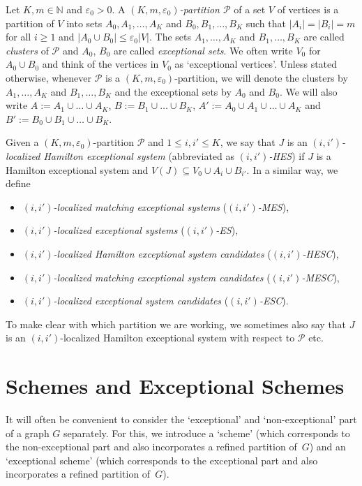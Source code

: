\documentclass{memo-l}
\def\cP{\mathcal{P}}
\def\eps{\varepsilon}
\def\epszero{\eps_0}
\numberwithin{section}{chapter}
\numberwithin{equation}{section}
\numberwithin{firstthm}{section}
\numberwithin{figure}{section}
\begin{document}
Let $K,m\in\mathbb{N}$ and $\eps_0>0$.
A \emph{$(K,m,\eps_0)$-partition $\mathcal{P}$} of a set $V$ of vertices is a partition of $V$ into sets $A_0,A_1,\dots,A_K$
and $B_0,B_1,\dots,B_K$ such that $|A_i|=|B_i|=m$ for all $i\ge 1$ and $|A_0\cup B_0|\le \eps_0 |V|$.
The sets $A_1,\dots,A_K$ and $B_1,\dots,B_K$ are called \emph{clusters} of $\mathcal{P}$
and $A_0$, $B_0$ are called \emph{exceptional sets}. We often write $V_0$ for $A_0\cup B_0$ and think of the
vertices in $V_0$ as `exceptional vertices'. Unless stated otherwise, whenever $\mathcal{P}$ is a $(K,m,\eps_0)$-partition,
we will denote the clusters by $A_1,\dots,A_K$ and $B_1,\dots,B_K$ and the exceptional sets by $A_0$ and $B_0$.
We will also write $A:=A_1\cup\dots\cup A_K$, $B:=B_1\cup\dots\cup B_K$, $A':=A_0\cup A_1\cup\dots\cup A_K$
and $B':=B_0\cup B_1\cup\dots\cup B_K$.

Given a $(K,m, \epszero)$-partition $\mathcal{P}$ and $1\le i,i' \le K$, we say that $J$ is an \emph{$ (i,i')$-localized Hamilton exceptional system}
(abbreviated as \emph{$(i,i')$-HES}) if $J$ is a Hamilton exceptional system and $V(J)\subseteq V_0 \cup A_{i} \cup B_{i'}$.
In a similar way, we define
\begin{itemize}
\item \emph{$ (i,i')$-localized matching exceptional systems} (\emph{$(i,i')$-MES}),
\item \emph{$ (i,i')$-localized exceptional systems} (\emph{$(i,i')$-ES}),
\item \emph{$ (i,i')$-localized Hamilton exceptional system candidates} (\emph{$(i,i')$-HESC}),
\item \emph{$ (i,i')$-localized matching exceptional system candidates} (\emph{$(i,i')$-MESC}),
\item \emph{$ (i,i')$-localized exceptional system candidates} (\emph{$(i,i')$-ESC}). 
\end{itemize}
To make clear with which partition we are working, we sometimes also say that
$J$ is an $ (i,i')$-localized Hamilton exceptional system with respect to $\cP$ etc.


\section{Schemes and Exceptional Schemes} \label{sec:schemes}

It will often be convenient to consider the `exceptional' and `non-exceptional' part of a graph $G$ separately.
For this, we introduce a `scheme' (which corresponds to the non-exceptional part and also incorporates a refined partition of~$G$) 
and an `exceptional scheme' (which corresponds to the exceptional part and also incorporates a refined partition of~$G$).
\end{document}
